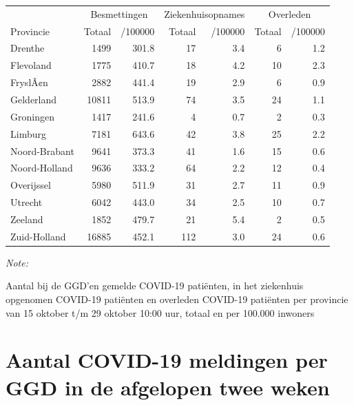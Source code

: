 \documentclass[
  english,
  man,floatsintext]{apa6}
\begin{document}
\begin{table}
\centering
\begin{threeparttable}
\begin{tabular}{lrrrrrr}
\toprule
\multicolumn{1}{c}{ } & \multicolumn{2}{c}{Besmettingen} & \multicolumn{2}{c}{Ziekenhuisopnames} & \multicolumn{2}{c}{Overleden} \\
\cmidrule(l{3pt}r{3pt}){2-3} \cmidrule(l{3pt}r{3pt}){4-5} \cmidrule(l{3pt}r{3pt}){6-7}
Provincie & Totaal & /100000 & Totaal & /100000 & Totaal & /100000\\
\midrule
Drenthe & 1499 & 301.8 & 17 & 3.4 & 6 & 1.2\\
Flevoland & 1775 & 410.7 & 18 & 4.2 & 10 & 2.3\\
FryslÃ¢n & 2882 & 441.4 & 19 & 2.9 & 6 & 0.9\\
Gelderland & 10811 & 513.9 & 74 & 3.5 & 24 & 1.1\\
Groningen & 1417 & 241.6 & 4 & 0.7 & 2 & 0.3\\
Limburg & 7181 & 643.6 & 42 & 3.8 & 25 & 2.2\\
Noord-Brabant & 9641 & 373.3 & 41 & 1.6 & 15 & 0.6\\
Noord-Holland & 9636 & 333.2 & 64 & 2.2 & 12 & 0.4\\
Overijssel & 5980 & 511.9 & 31 & 2.7 & 11 & 0.9\\
Utrecht & 6042 & 443.0 & 34 & 2.5 & 10 & 0.7\\
Zeeland & 1852 & 479.7 & 21 & 5.4 & 2 & 0.5\\
Zuid-Holland & 16885 & 452.1 & 112 & 3.0 & 24 & 0.6\\
\bottomrule
\end{tabular}
\begin{tablenotes}
\item \textit{Note: } 
\item Aantal bij de GGD’en gemelde COVID-19 patiënten, in het ziekenhuis opgenomen COVID-19 patiënten en overleden COVID-19 patiënten per provincie van 15 oktober t/m 29 oktober 10:00 uur, totaal en per 100.000 inwoners
\end{tablenotes}
\end{threeparttable}
\end{table}

\newpage

\hypertarget{aantal-covid-19-meldingen-per-ggd-in-de-afgelopen-twee-weken}{%
\section{Aantal COVID-19 meldingen per GGD in de afgelopen twee weken}\label{aantal-covid-19-meldingen-per-ggd-in-de-afgelopen-twee-weken}}
\end{document}
